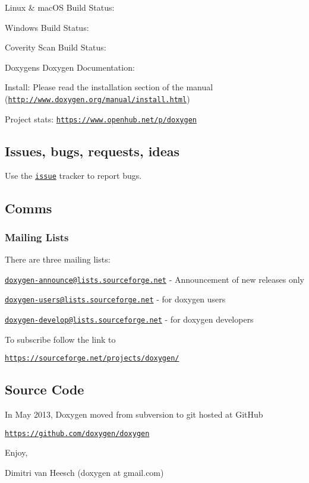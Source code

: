\begin{DoxyItemize}
\item Linux \& mac\+OS Build Status\+: \href{https://travis-ci.org/doxygen/doxygen}{\tt }
\item Windows Build Status\+: \href{https://ci.appveyor.com/project/doxygen/doxygen}{\tt }
\item Coverity Scan Build Status\+: \href{https://scan.coverity.com/projects/2860}{\tt }
\item Doxygen\textquotesingle{}s Doxygen Documentation\+: \href{https://codedocs.xyz/doxygen/doxygen/}{\tt }
\item Install\+: Please read the installation section of the manual (\href{http://www.doxygen.org/manual/install.html}{\tt http\+://www.\+doxygen.\+org/manual/install.\+html})
\item Project stats\+: \href{https://www.openhub.net/p/doxygen}{\tt https\+://www.\+openhub.\+net/p/doxygen}
\end{DoxyItemize}

\subsection*{Issues, bugs, requests, ideas }

Use the \href{https://github.com/doxygen/doxygen/issues}{\tt issue} tracker to report bugs.

\subsection*{Comms }

\subsubsection*{Mailing Lists}

There are three mailing lists\+:


\begin{DoxyItemize}
\item \href{mailto:doxygen-announce@lists.sourceforge.net}{\tt doxygen-\/announce@lists.\+sourceforge.\+net} -\/ Announcement of new releases only
\item \href{mailto:doxygen-users@lists.sourceforge.net}{\tt doxygen-\/users@lists.\+sourceforge.\+net} -\/ for doxygen users
\item \href{mailto:doxygen-develop@lists.sourceforge.net}{\tt doxygen-\/develop@lists.\+sourceforge.\+net} -\/ for doxygen developers
\item To subscribe follow the link to
\begin{DoxyItemize}
\item \href{https://sourceforge.net/projects/doxygen/}{\tt https\+://sourceforge.\+net/projects/doxygen/}
\end{DoxyItemize}
\end{DoxyItemize}

\subsection*{Source Code }

In May 2013, Doxygen moved from subversion to git hosted at Git\+Hub
\begin{DoxyItemize}
\item \href{https://github.com/doxygen/doxygen}{\tt https\+://github.\+com/doxygen/doxygen}
\end{DoxyItemize}

Enjoy,

Dimitri van Heesch (doxygen at gmail.\+com) 